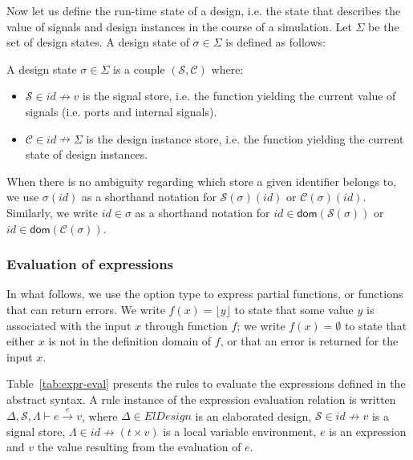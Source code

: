 Now let us define the run-time state of a design, i.e. the state that
describes the value of signals and design instances in the course of a
simulation. Let $\Sigma$ be the set of design states.  A design state
of $\sigma\in{}\Sigma$ is defined as follows:

\begin{definition}
  \label{def:design-state}
  A design state $\sigma\in\Sigma$ is a couple
  $(\mathcal{S},\mathcal{C})$ where:
  \begin{itemize}[label=$-$]
  \item $\mathcal{S}\in{}id\nrightarrow{}v$ is the signal store,
    i.e. the function yielding the current value of signals
    (i.e. ports and internal signals).
  \item $\mathcal{C}\in{}id\nrightarrow{}\Sigma$ is the design
    instance store, i.e.  the function yielding the current state of
    design instances.
  \end{itemize}
\end{definition}

When there is no ambiguity regarding which store a given identifier
belongs to, we use $\sigma(id)$ as a shorthand notation for
$\mathcal{S}(\sigma)(id)$ or $\mathcal{C}(\sigma)(id)$.  Similarly, we
write $id\in\sigma$ as a shorthand notation for
$id\in\mathsf{dom}(\mathcal{S}(\sigma))$ or
$id\in\mathsf{dom}(\mathcal{C}(\sigma))$.

\subsubsection{Evaluation of expressions}
\label{subsubsec:expr-eval}

In what follows, we use the option type to express partial functions,
or functions that can return errors.  We write
$f(x)=\lfloor{}y\rfloor$ to state that some value $y$ is associated
with the input $x$ through function $f$; we write $f(x)=\emptyset$ to
state that either $x$ is not in the definition domain of $f$, or that
an error is returned for the input $x$.

Table~\ref{tab:expr-eval} presents the rules to evaluate the
expressions defined in the \hvhdl{} abstract syntax. A rule instance
of the expression evaluation relation is written
$\Delta,\mathcal{S},\Lambda\vdash{}e\xrightarrow{e}v$, where
$\Delta\in{}ElDesign$ is an elaborated design,
$\mathcal{S}\in{}id\nrightarrow{}v$ is a signal store,
$\Lambda\in{}id\nrightarrow(t\times{}v)$ is a local variable
environment, $e$ is an expression and $v$ the value resulting from the
evaluation of $e$.

